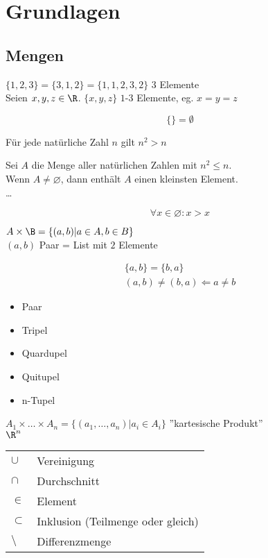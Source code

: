 \chapter{Grundlagen}
\section{Mengen}
\begin{bsp*}
	$\{1,2,3\} = \{3,1,2\} = \{1,1,2,3,2\}$ \qquad $3$ Elemente\\
	Seien $x, y, z \in \R$. $\{x,y,z\}$ \qquad $1$-$3$ Elemente, eg. $x = y = z$
\end{bsp*}

\[ \{\} = \emptyset \]

\begin{bsp*}
	Für jede natürliche Zahl $n$ gilt $n^2 > n$\\
	\begin{bew}
		Sei $A$ die Menge aller natürlichen Zahlen mit $n^2 \leq n$.\\
		Wenn $A \neq \varnothing$, dann enthält $A$ einen kleinsten Element.\\
		\dots
	\end{bew}
\end{bsp*}

\[ \forall x \in \varnothing : x > x \]

$A \times \B = \{ (a,b) | a \in A, b \in B \}$\\
$(a,b)$ Paar = List mit $2$ Elemente

\begin{gather*}
	\{a,b\} = \{b,a\} \\
	(a,b) \neq (b,a) \Leftarrow a \neq b
\end{gather*}

\begin{itemize}
	\item Paar
	\item Tripel
	\item Quardupel
	\item Quitupel
	\item n-Tupel
\end{itemize}

$A_1 \times \dots \times A_n = \{ (a_1 , \dotsc , a_n ) | a_i \in A_i \}$ ''kartesische Produkt''\\
$\R^n$\\

\begin{tabular}{ll}
	$\cup$		&Vereinigung					\\
	$\cap$		&Durchschnitt					\\
	$\in$			&Element						\\
	$\subset$		&Inklusion (Teilmenge oder gleich)	\\
	$\setminus$	&Differenzmenge				
\end{tabular}

